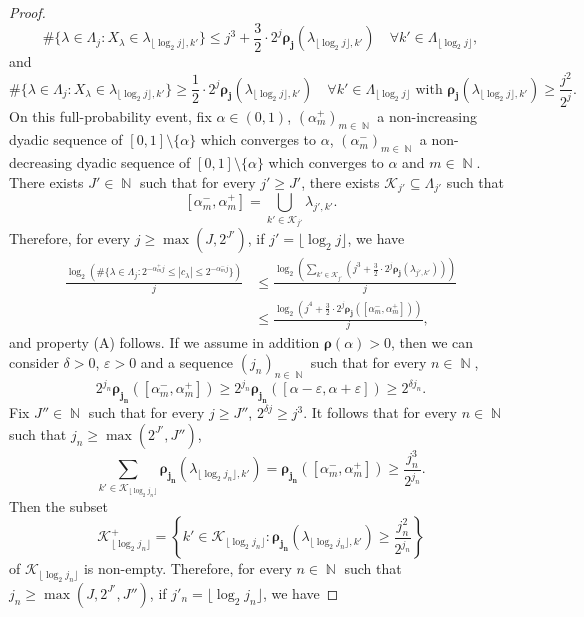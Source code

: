 \documentclass[a4paper,11pt,oneside]{article}
\DeclareMathOperator{\N}{\mathbb{N}}
\newcommand{\ccint}[1]{\left[{#1}\right]}
\newcommand{\ooint}[1]{\left({#1}\right)}
\newcommand{\modu}[1]{\left\vert{#1}\right\vert}
\theoremstyle{definition}
\theoremstyle{plain}
\begin{document}
\begin{proof}
\[
\#\{\lambda\in\Lambda_j:X_\lambda\in\lambda_{\lfloor \log_2j\rfloor,k'}\}\leq j^3+\frac{3}{2}\cdot2^j\bm{\rho_j}(\lambda_{\lfloor \log_2j\rfloor,k'}) \quad\forall k'\in\Lambda_{\lfloor \log_2j\rfloor},
\]
and
\[
\#\{\lambda\in\Lambda_j:X_\lambda\in\lambda_{\lfloor \log_2j\rfloor,k'}\}\geq \frac{1}{2}\cdot2^j\bm{\rho_j}(\lambda_{\lfloor \log_2j\rfloor,k'})\quad\forall k'\in\Lambda_{\lfloor \log_2j\rfloor} \text{ with } \bm{\rho_j}(\lambda_{\lfloor\log_2j\rfloor,k'})\geq \frac{j^2}{2^j}.
\]
On this full-probability event, fix $\alpha\in\ooint{0,1}$, $(\alpha_m^+)_{m\in\N}$ a non-increasing dyadic sequence of \mbox{$\ccint{0,1}\setminus\{\alpha\}$} which converges to $\alpha$, $(\alpha^-_m)_{m\in\N}$ a non-decreasing dyadic sequence of $\ccint{0,1}\setminus\{\alpha\}$ which converges to $\alpha$ and $m\in\N$. There exists $J'\in\N$ such that for every $j'\geq J'$, there exists $\mathcal{K}_{j'}\subseteq\Lambda_{j'}$ such that
\[
\ccint{\alpha_m^-,\alpha_m^+}=\bigcup_{k'\in\mathcal{K}_{j'}}\lambda_{j',k'}.
\]
Therefore, for every $j\geq\max\left(J,2^{J'}\right)$, if $j'=\lfloor\log_2j\rfloor$, we have
\begin{align*}
\frac{\log_2\left(\#\{\lambda\in\Lambda_j:2^{-\alpha_m^+j}\leq\modu{c_\lambda}\leq2^{-\alpha_m^-j}\}\right)}{j}
& \leq \frac{\log_2\left(\sum_{k'\in\mathcal{K}_{j'}}\left(j^3 + \frac{3}{2}\cdot2^j\bm{\rho_j}(\lambda_{j',k'})\right)\right)}{j} \\
& \leq \frac{\log_2\left(j^4+\frac{3}{2}\cdot 2^j\bm{\rho_j}\left(\ccint{\alpha_m^-,\alpha_m^+}\right)\right)}{j},
\end{align*}
and property (A) follows. If we assume in addition $\bm{\rho}(\alpha)>0$, then we can consider $\delta>0$, $\varepsilon>0$ and a sequence $(j_n)_{n\in\N}$ such that for every $n\in\N$, 
\[
2^{j_n}\bm{\rho_{j_n}}(\ccint{\alpha_m^-,\alpha_m^+})\geq2^{j_n}\bm{\rho_{j_n}}(\ccint{\alpha-\varepsilon,\alpha+\varepsilon})\geq 2^{\delta j_n}.
\]
Fix $J''\in\N$ such that for every $j\geq J''$, $2^{\delta j}\geq j^3$. It follows that for every $n\in\N$ such that $ j_n\geq \max\left(2^{J'},J''\right)$, 
\[
\sum_{k'\in\mathcal{K}_{\lfloor\log_2j_n\rfloor}}\bm{\rho_{j_n}}(\lambda_{\lfloor\log_2j_n\rfloor,k'})=\bm{\rho_{j_n}}(\ccint{\alpha_m^-,\alpha_m^+})\geq \frac{j_n^3}{2^{j_n}}.
\]
Then the subset 
\[
\mathcal{K}_{\lfloor\log_2j_n\rfloor}^+=\left\{k'\in\mathcal{K}_{\lfloor\log_2j_n\rfloor}:\bm{\rho_{j_n}}(\lambda_{\lfloor\log_2j_n\rfloor,k'})\geq \frac{j_n^2}{2^{j_n}}\right\}
\]
of $\mathcal{K}_{\lfloor\log_2j_n\rfloor}$ is non-empty. Therefore, for every $n\in\N$ such that $j_n\geq\max\left(J,2^{J'},J''\right)$, if \mbox{$j'_n=\lfloor\log_2j_n\rfloor$}, we have

\end{proof}
\end{document}
